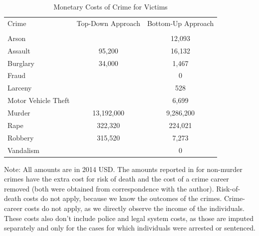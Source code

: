 \documentclass[static]{JJH-Beamer}
\begin{document}
\begin{frame}

\begin{table}[H]
\caption{Monetary Costs of Crime for Victims} \label{tab:individual-crime-cost}
\begin{center}
\begin{tabular}{lcc}
\toprule
Crime				&Top-Down Approach	&Bottom-Up Approach	\\
					& \cite{Cohen_Rust_etal_2004_Criminology}&\cite{McCollister_etal_2010_DAD}\\ \midrule
Arson				&					&12,093			\\
Assault				&95,200			&16,132 			\\
Burglary			&34,000			&1,467 			\\		
Fraud				&				&0				\\
Larceny				&				&528 				\\
Motor Vehicle Theft	&				&6,699 			\\
Murder				&13,192,000		&9,286,200 		\\
Rape				&322,320			&224,021 			\\
Robbery				&315,520			&7,273 			\\
Vandalism			&					&0				\\ \bottomrule
\end{tabular}
\end{center}
\end{table}

\end{frame}

{\flushleft \normalsize Note: All amounts are in 2014 USD. The amounts reported in \cite{McCollister_etal_2010_DAD} for non-murder crimes have the extra cost for risk of death and the cost of a crime career removed (both were obtained from correspondence with the author). Risk-of-death costs do not apply, because we know the outcomes of the crimes. Crime-career costs do not apply, as we directly observe the income of the individuals. These costs also don't include police and legal system costs, as those are imputed separately and only for the cases for which individuals were arrested or sentenced.\\}
\end{document}
